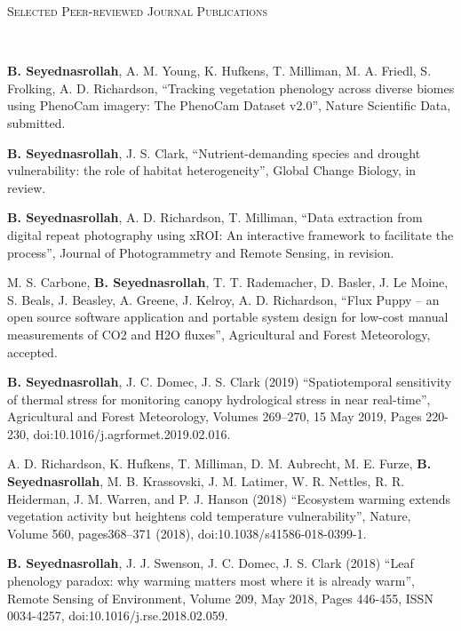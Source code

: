 \documentclass[10pt]{article}
\newenvironment{changemargin}[2]{%
  \begin{list}{}{%
    \setlength{\topsep}{0pt}%
    \setlength{\leftmargin}{#1}%
    \setlength{\rightmargin}{#2}%
    \setlength{\listparindent}{\parindent}%
    \setlength{\itemindent}{\parindent}%
    \setlength{\parsep}{\parskip}%
  }%
  \item[]}{\end{list}
}
\newcommand{\lineover}{
	\begin{changemargin}{-0.05in}{-0.05in}
		\vspace*{-8pt}
		\hrulefill \\
		\vspace*{-2pt}
	\end{changemargin}
}
\newcommand{\header}[1]{
	\begin{changemargin}{-0.5in}{-0.5in}
		\scshape{#1}\\
  	\lineover
	\end{changemargin}
}
\newenvironment{body} {
	\vspace*{-2pt}
	\begin{changemargin}{-0.5in}{-0.5in}
  }
	{\end{changemargin}
}
\begin{document}
\medskip
\header{Selected Peer-reviewed Journal Publications}

\begin{body}
\medskip


\textbf{B. Seyednasrollah}, A. M. Young, K. Hufkens, T. Milliman, M. A. Friedl, S. Frolking, A. D. Richardson, ``Tracking vegetation phenology across diverse biomes using PhenoCam imagery: The PhenoCam Dataset v2.0'', Nature Scientific Data, submitted.\\
\medskip

	\textbf{B. Seyednasrollah}, J. S. Clark, ``Nutrient-demanding species and drought vulnerability: the role of habitat heterogeneity'', Global Change Biology, in review.\\
\medskip

	\textbf{B. Seyednasrollah}, A. D. Richardson, T. Milliman, ``Data extraction from digital repeat photography using xROI: An interactive framework to facilitate the process'', Journal of Photogrammetry and Remote Sensing, in revision.\\
\medskip

M. S. Carbone, \textbf{B. Seyednasrollah}, T. T. Rademacher, D. Basler, J. Le Moine, S. Beals, J. Beasley, A. Greene, J. Kelroy, A. D. Richardson, ``Flux Puppy – an open source software application and portable system design for low-cost manual measurements of CO2 and H2O fluxes'', Agricultural and Forest Meteorology, accepted.\\
\medskip


	\textbf{B. Seyednasrollah}, J. C. Domec, J. S. Clark (2019) ``Spatiotemporal sensitivity of thermal stress for monitoring canopy hydrological stress in near real-time'', Agricultural and Forest Meteorology, Volumes 269–270, 15 May 2019, Pages 220-230, doi:10.1016/j.agrformet.2019.02.016.\\
\medskip

	A. D. Richardson, K. Hufkens, T. Milliman, D. M. Aubrecht, M. E. Furze, \textbf{B. Seyednasrollah}, M. B. Krassovski, J. M. Latimer, W. R. Nettles, R. R. Heiderman, J. M. Warren, and P. J. Hanson (2018) ``Ecosystem warming extends vegetation activity but heightens cold temperature vulnerability'', Nature, Volume 560, pages368–371 (2018), doi:10.1038/s41586-018-0399-1.\\
\medskip

	\textbf{B. Seyednasrollah}, J. J. Swenson, J. C. Domec, J. S. Clark (2018) ``Leaf phenology paradox: why warming matters most where it is already warm'', Remote Sensing of Environment, Volume 209, May 2018, Pages 446-455, ISSN 0034-4257, doi:10.1016/j.rse.2018.02.059.\\
\medskip


\end{body}
\end{document}
